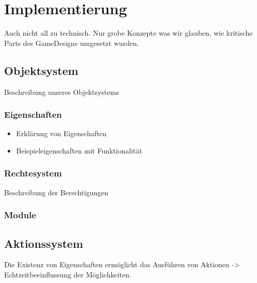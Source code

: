 \chapter{Implementierung}
\label{implementation}

Auch nicht all zu technisch. Nur grobe Konzepte was wir glauben, wie kritische Parts des GameDesigns umgesetzt wurden.

\section{Objektsystem}
\label{sec:Objektsystem}
Beschreibung unseres Objektsystems\newline


\subsection{Eigenschaften}
\label{sec:Eigenschaften}

\begin{itemize}
	\item Erklärung von Eigenschaften
	\item Beispieleigenschaften mit Funktionalität 
\end{itemize}

\subsection{Rechtesystem}
\label{sec:Rechtesystem}
Beschreibung der Berechtigungen

\subsection{Module}
\label{sec:Module}

\section{Aktionssystem}
\label{sec:Aktionssystem}
Die Existenz von Eigenschaften ermöglicht das Ausführen von Aktionen -> Echtzeitbeeinflussung der Möglichkeiten.
